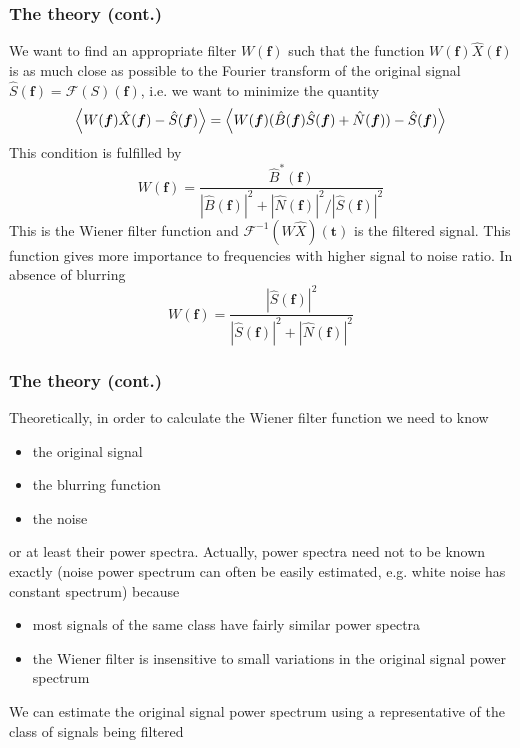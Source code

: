 \documentclass[10pt]{beamer}
\begin{document}
\begin{frame}
  \frametitle{The theory (cont.)}
  We want to find an appropriate filter \(W(\bm{f})\) such that the function
  \(W(\bm{f})\hat{X}(\bm{f})\) is as much close as possible to the Fourier
  transform of the original signal \(\hat{S}(\bm{f}) = \mathcal{F}(S)(\bm{f})\),
  i.e. we want to minimize the quantity
  \begin{equation*}
    \Braket{W(\bm{f})\hat{X}(\bm{f}) - \hat{S}(\bm{f})} =
    \Braket{W(\bm{f})(\hat{B}(\bm{f})\hat{S}(\bm{f}) + \hat{N}(\bm{f})) -
      \hat{S}(\bm{f})}
  \end{equation*}
  This condition is fulfilled by
  \begin{equation*}
    W(\bm{f}) = \frac{\hat{B}^{*}(\bm{f})}{|\hat{B}(\bm{f})|^{2} +
      |\hat{N}(\bm{f})|^{2}/|\hat{S}(\bm{f})|^{2}}
  \end{equation*}
  This is the \alert{Wiener filter} function and
  \(\mathcal{F}^{-1}(W\hat{X})(\bm{t})\) is the \alert{filtered signal}.  This
  function gives more importance to frequencies with \alert{higher signal to
    noise ratio}.  In absence of blurring
  \begin{equation*}
    W(\bm{f}) = \frac{|\hat{S}(\bm{f})|^{2}}{|\hat{S}(\bm{f})|^{2} +
      |\hat{N}(\bm{f})|^{2}}
  \end{equation*}
\end{frame}

\begin{frame}
  \frametitle{The theory (cont.)}
  Theoretically, in order to calculate the Wiener filter function we need to
  know
  \begin{itemize}
  \item the original signal
  \item the blurring function
  \item the noise
  \end{itemize}
  or at least their power spectra.  Actually, power spectra need not to be known
  exactly (\alert{noise power spectrum can often be easily estimated},
  e.g. white noise has constant spectrum) because
  \begin{itemize}
  \item most signals of the same class have fairly \alert{similar power spectra}
  \item the Wiener filter is \alert{insensitive to small variations} in the
    original signal power spectrum
  \end{itemize}
  We can estimate the original signal power spectrum using a
  \alert{representative of the class of signals being filtered}
\end{frame}
\end{document}

